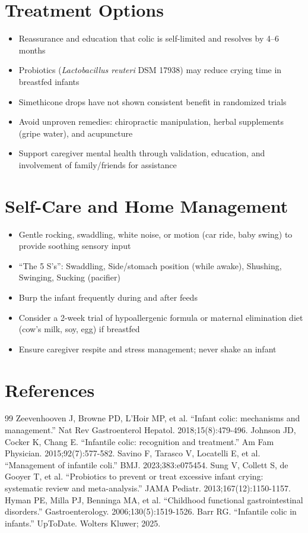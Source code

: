 \section*{Treatment Options}
\begin{itemize}
  \item Reassurance and education that colic is self-limited and resolves by 4--6 months
  \item Probiotics (\textit{Lactobacillus reuteri} DSM 17938) may reduce crying time in breastfed infants
  \item Simethicone drops have not shown consistent benefit in randomized trials
  \item Avoid unproven remedies: chiropractic manipulation, herbal supplements (gripe water), and acupuncture
  \item Support caregiver mental health through validation, education, and involvement of family/friends for assistance
\end{itemize}

\section*{Self-Care and Home Management}
\begin{itemize}
  \item Gentle rocking, swaddling, white noise, or motion (car ride, baby swing) to provide soothing sensory input
  \item ``The 5 S's'': Swaddling, Side/stomach position (while awake), Shushing, Swinging, Sucking (pacifier)
  \item Burp the infant frequently during and after feeds
  \item Consider a 2-week trial of hypoallergenic formula or maternal elimination diet (cow's milk, soy, egg) if breastfed
  \item Ensure caregiver respite and stress management; never shake an infant
\end{itemize}

\section*{References}
\begin{thebibliography}{99}
 Zeevenhooven J, Browne PD, L'Hoir MP, et al. ``Infant colic: mechanisms and management.'' Nat Rev Gastroenterol Hepatol. 2018;15(8):479-496.
 Johnson JD, Cocker K, Chang E. ``Infantile colic: recognition and treatment.'' Am Fam Physician. 2015;92(7):577-582.
 Savino F, Tarasco V, Locatelli E, et al. ``Management of infantile coli.'' BMJ. 2023;383:e075454.
 Sung V, Collett S, de Gooyer T, et al. ``Probiotics to prevent or treat excessive infant crying: systematic review and meta-analysis.'' JAMA Pediatr. 2013;167(12):1150-1157.
 Hyman PE, Milla PJ, Benninga MA, et al. ``Childhood functional gastrointestinal disorders.'' Gastroenterology. 2006;130(5):1519-1526.
 Barr RG. ``Infantile colic in infants.'' UpToDate. Wolters Kluwer; 2025.
\end{thebibliography}
